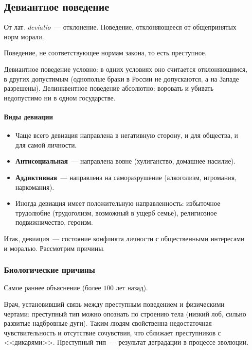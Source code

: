 \documentclass[12pt]{article}
\begin{document}
	\subsection{Девиантное поведение}

	\begin{definition}
		От лат. \textit{deviatio}~--- отклонение. Поведение, отклоняющееся от общепринятых норм морали.
	\end{definition}

	\begin{definition}
		Поведение, не соответствующее нормам закона, то есть преступное.
	\end{definition}

	\begin{note}
		Девиантное поведение условно: в одних условиях оно считается отклоняющимся, в других допустимым (однополые браки в России не допускаются, а на Западе разрешены). Делинквентное поведение абсолютно: воровать и убивать недопустимо ни в одном государстве.
	\end{note}

	\paragraph{Виды девиации}
	\begin{itemize}
		\item Чаще всего девиация направлена в негативную сторону, и для общества, и для самой личности.
		\item \textbf{Антисоциальная}~--- направлена вовне (хулиганство, домашнее насилие).
		\item \textbf{Аддиктивная}~--- направлена на саморазрушение (алкоголизм, игромания, наркомания).
		\item Иногда девиация имеет положительную направленность: избыточное трудолюбие (трудоголизм, возможный в ущерб семье), религиозное подвижничество, героизм.
	\end{itemize}

	Итак, девиация~--- состояние конфликта личности с общественными интересами и моралью. Рассмотрим причины.

	\subsubsection{Биологические причины}

	Самое раннее объяснение (более $100$ лет назад).

	\begin{person}
		Врач, установивший связь между преступным поведением и физическими чертами: преступный тип можно опознать по строению тела (низкий лоб, сильно развитые надбровные дуги). Таким людям свойственна недостаточная чувствительность и отсутствие сочувствия, что сближает преступников с <<дикарями>>. Преступный тип~--- результат деградации в процессе эволюции.
	\end{person}
\end{document}

